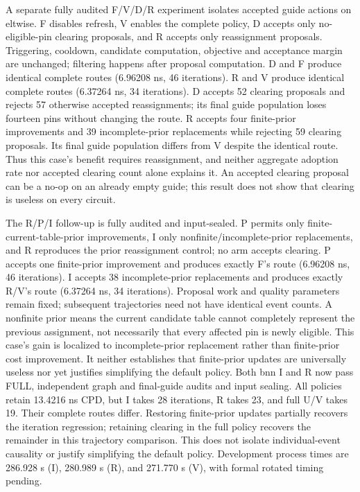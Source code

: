 \documentclass[conference,10pt]{IEEEtran}
\begin{document}
A separate fully audited F/V/D/R experiment isolates accepted guide actions on eltwise. F disables refresh, V enables the complete policy, D accepts only no-eligible-pin clearing proposals, and R accepts only reassignment proposals. Triggering, cooldown, candidate computation, objective and acceptance margin are unchanged; filtering happens after proposal computation. D and F produce identical complete routes (6.96208 ns, 46 iterations). R and V produce identical complete routes (6.37264 ns, 34 iterations). D accepts 52 clearing proposals and rejects 57 otherwise accepted reassignments; its final guide population loses fourteen pins without changing the route. R accepts four finite-prior improvements and 39 incomplete-prior replacements while rejecting 59 clearing proposals. Its final guide population differs from V despite the identical route. Thus this case's benefit requires reassignment, and neither aggregate adoption rate nor accepted clearing count alone explains it. An accepted clearing proposal can be a no-op on an already empty guide; this result does not show that clearing is useless on every circuit.

The R/P/I follow-up is fully audited and input-sealed. P permits only finite-current-table-prior improvements, I only nonfinite/incomplete-prior replacements, and R reproduces the prior reassignment control; no arm accepts clearing. P accepts one finite-prior improvement and produces exactly F's route (6.96208 ns, 46 iterations). I accepts 38 incomplete-prior replacements and produces exactly R/V's route (6.37264 ns, 34 iterations). Proposal work and quality parameters remain fixed; subsequent trajectories need not have identical event counts. A nonfinite prior means the current candidate table cannot completely represent the previous assignment, not necessarily that every affected pin is newly eligible. This case's gain is localized to incomplete-prior replacement rather than finite-prior cost improvement. It neither establishes that finite-prior updates are universally useless nor yet justifies simplifying the default policy. Both bnn I and R now pass FULL, independent graph and final-guide audits and input sealing. All policies retain 13.4216 ns CPD, but I takes 28 iterations, R takes 23, and full U/V takes 19. Their complete routes differ. Restoring finite-prior updates partially recovers the iteration regression; retaining clearing in the full policy recovers the remainder in this trajectory comparison. This does not isolate individual-event causality or justify simplifying the default policy. Development process times are 286.928 s (I), 280.989 s (R), and 271.770 s (V), with formal rotated timing pending.
\end{document}
